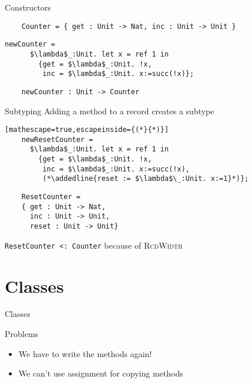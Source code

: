 \documentclass[presentation,xcolor=svgnames]{beamer}
\begin{document}
\begin{frame}[fragile]{Constructors}
  \begin{lstlisting}
    Counter = { get : Unit -> Nat, inc : Unit -> Unit }
  \end{lstlisting}

  \begin{lstlisting}[mathescape=true]
    newCounter =
      $\lambda$_:Unit. let x = ref 1 in
        {get = $\lambda$_:Unit. !x,
         inc = $\lambda$_:Unit. x:=succ(!x)};
  \end{lstlisting}

  \begin{lstlisting}
    newCounter : Unit -> Counter
  \end{lstlisting}
\end{frame}


\newcommand{\addedline}[1]{\colorbox{green}{#1}}

\begin{frame}[fragile]{Subtyping}
  Adding a method to a record creates a subtype
  \begin{block}{ }
  \begin{lstlisting}[mathescape=true,escapeinside={(*}{*)}]
    newResetCounter =
      $\lambda$_:Unit. let x = ref 1 in
        {get = $\lambda$_:Unit. !x,
         inc = $\lambda$_:Unit. x:=succ(!x),
         (*\addedline{reset := $\lambda$\_:Unit. x:=1}*)};
  \end{lstlisting}
  \end{block}

  \begin{lstlisting}
    ResetCounter =
    { get : Unit -> Nat,
      inc : Unit -> Unit,
      reset : Unit -> Unit}
  \end{lstlisting}

  \texttt{ResetCounter <: Counter} because of \textsc{RcdWidth}

\end{frame}

\section{Classes}

\begin{frame}{Classes}
  \begin{block}{Problems}
    \begin{itemize}
    \item We have to write the methods again!
    \item We can't use assignment for copying methods
    \end{itemize}
  \end{block}
\end{frame}
\end{document}
